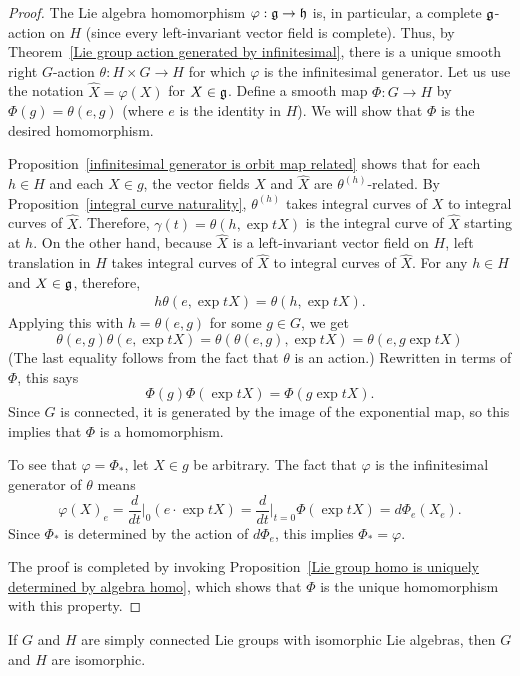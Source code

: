 \begin{proof}
The Lie algebra homomorphism $\varphi:\mathfrak{g}\to\mathfrak{h}$ is, in particular, a complete $\mathfrak{g}$-action on $H$ (since every left-invariant vector field is complete). Thus, by Theorem~\ref{Lie group action generated by infinitesimal}, there is a unique smooth right $G$-action $\theta:H\times G\to H$ for which $\varphi$ is the infinitesimal generator. Let us use the notation $\widehat{X}=\varphi(X)$ for $X\in\mathfrak{g}$. Define a smooth map $\varPhi:G\to H$ by $\varPhi(g)=\theta(e,g)$ (where $e$ is the identity in $H$). We will show that $\varPhi$ is the desired homomorphism.\par
Proposition~\ref{infinitesimal generator is orbit map related} shows that for each $h\in H$ and each $X\in g$, the vector fields $X$ and $\widehat{X}$ are $\theta^{(h)}$-related. By Proposition~\ref{integral curve naturality}, $\theta^{(h)}$ takes integral curves of $X$ to integral curves of $\widehat{X}$. Therefore, $\gamma(t)=\theta(h,\exp tX)$ is the integral curve of $\widehat{X}$ starting at $h$. On the other hand, because $\widehat{X}$ is a left-invariant vector field on $H$, left translation in $H$ takes integral curves of $\widehat{X}$ to integral curves of $\widehat{X}$. For any $h\in H$ and $X\in\mathfrak{g}$, therefore,
\begin{align}\label{Lie group homomorphism induced by algebra homo-1}
h\theta(e,\exp tX)=\theta(h,\exp tX).
\end{align}
Applying this with $h=\theta(e,g)$ for some $g\in G$, we get
\[\theta(e,g)\theta(e,\exp tX)=\theta(\theta(e,g),\exp tX)=\theta(e,g\exp tX)\]
(The last equality follows from the fact that $\theta$ is an action.) Rewritten in terms of $\varPhi$, this says
\[\varPhi(g)\varPhi(\exp tX)=\varPhi(g\exp tX).\]
Since $G$ is connected, it is generated by the image of the exponential map, so this implies that $\varPhi$ is a homomorphism.\par
To see that $\varphi=\varPhi_*$, let $X\in g$ be arbitrary. The fact that $\varphi$ is the infinitesimal generator of $\theta$ means
\[\varphi(X)_e=\frac{d}{dt}\Big|_0(e\cdot\exp tX)=\frac{d}{dt}\Big|_{t=0}\varPhi(\exp tX)=d\varPhi_e(X_e).\]
Since $\varPhi_*$ is determined by the action of $d\varPhi_e$, this implies $\varPhi_*=\varphi$.\par
The proof is completed by invoking Proposition~\ref{Lie group homo is uniquely determined by algebra homo}, which shows that $\varPhi$ is the unique homomorphism with this property.
\end{proof}
\begin{corollary}\label{Lie group simply connected isomorphic iff Lie algebra isomorphic}
If $G$ and $H$ are simply connected Lie groups with isomorphic Lie algebras, then $G$ and $H$ are isomorphic.
\end{corollary}
